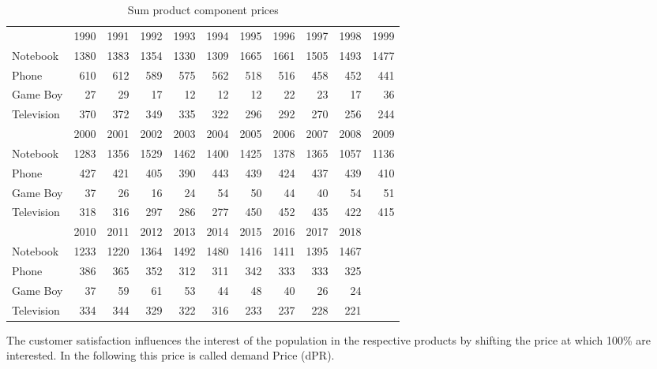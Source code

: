 \begin{table}[ht]
    \centering
    \begin{tabular}{|l|r|r|r|r|r|r|r|r|r|r|}
    \hline
                & 1990  & 1991  & 1992  & 1993  & 1994  & 1995  & 1996  & 1997  & 1998  & 1999  \\
    Notebook    & 1380  & 1383  & 1354  & 1330  & 1309  & 1665  & 1661  & 1505  & 1493  & 1477  \\   
    Phone       & 610   & 612   & 589   & 575   & 562   & 518   & 516   & 458   & 452   & 441   \\ 
    Game Boy    & 27    & 29    & 17    & 12    & 12    & 12    & 22    & 23    & 17    & 36    \\  
    Television  & 370   & 372   & 349   & 335   & 322   & 296   & 292   & 270   & 256   & 244    \\ 
    \hline       
                & 2000  & 2001  & 2002  & 2003  & 2004  & 2005  & 2006  & 2007  & 2008  & 2009 \\
    Notebook    & 1283  & 1356  & 1529  & 1462  & 1400  & 1425  & 1378  & 1365  & 1057  & 1136 \\   
    Phone       & 427   & 421   & 405   & 390   & 443   & 439   & 424   & 437   & 439   & 410 \\  
    Game Boy    & 37    & 26    & 16    & 24    & 54    & 50    & 44    & 40    & 54    & 51  \\   
    Television  & 318   & 316   & 297   & 286   & 277   & 450   & 452   & 435   & 422   & 415 \\ 
    \hline
                & 2010  & 2011  & 2012  & 2013  & 2014  & 2015  & 2016  & 2017  & 2018   & \\
    Notebook    & 1233  & 1220  & 1364  & 1492  & 1480  & 1416  & 1411  & 1395  & 1467   & \\   
    Phone       & 386   & 365   & 352   & 312   & 311   & 342   & 333   & 333   & 325    & \\ 
    Game Boy    & 37    & 59    & 61    & 53    & 44    & 48    & 40    & 26    & 24     & \\  
    Television  & 334   & 344   & 329   & 322   & 316   & 233   & 237   & 228   & 221    & \\ 
    \hline
    \end{tabular}
    \caption{Sum product component prices}
    \label{sum_product_component_prices}
\end{table}
 
The customer satisfaction influences the interest of the population in the respective products by shifting the price at which 100\% are interested. In the following this price is called demand Price (\gls{dPR}).
 

